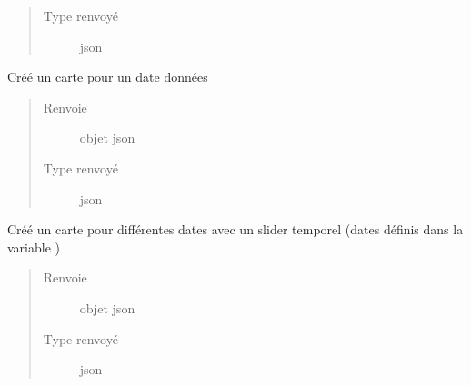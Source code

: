\documentclass[letterpaper,10pt,french]{sphinxmanual}
\begin{document}
\begin{fulllineitems}
\begin{fulllineitems}
\begin{quote}
\begin{description}
\item[{Type renvoyé}] \leavevmode
\sphinxAtStartPar
json

\end{description}\end{quote}

\end{fulllineitems}


\begin{fulllineitems}
\label{\detokenize{app.home.content_gen:app.home.content_gen.map_generation.FirePlot.plot_at_date}}
\sphinxAtStartPar
Créé un carte pour un date données
\begin{quote}\begin{description}
\item[{Renvoie}] \leavevmode
\sphinxAtStartPar
objet json

\item[{Type renvoyé}] \leavevmode
\sphinxAtStartPar
json

\end{description}\end{quote}

\end{fulllineitems}


\begin{fulllineitems}
\label{\detokenize{app.home.content_gen:app.home.content_gen.map_generation.FirePlot.plot_cursor}}
\sphinxAtStartPar
Créé un carte pour différentes dates avec un slider temporel
(dates définis dans la variable )
\begin{quote}\begin{description}
\item[{Renvoie}] \leavevmode
\sphinxAtStartPar
objet json

\item[{Type renvoyé}] \leavevmode
\sphinxAtStartPar
json

\end{description}\end{quote}


\end{fulllineitems}
\end{fulllineitems}
\end{document}
